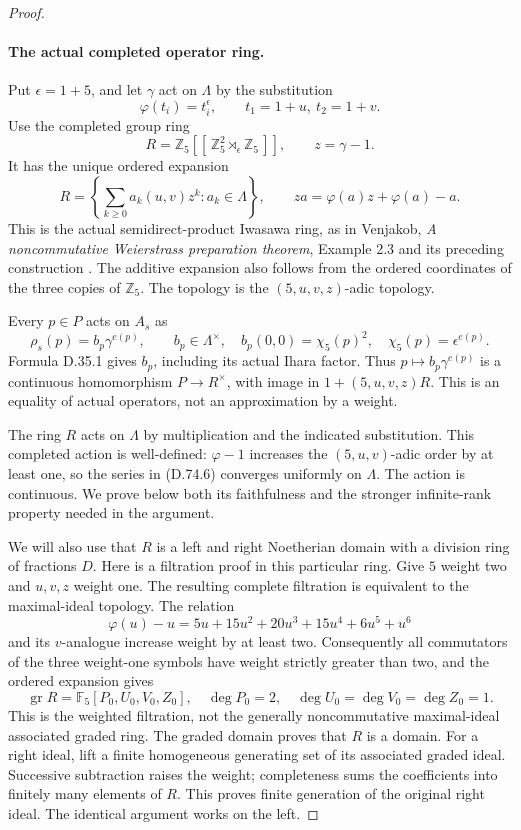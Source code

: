\begin{proof}
\paragraph{The actual completed operator ring.}
Put \(\epsilon=1+5\), and let
\(\gamma\) act on \(\Lambda\) by the substitution
\[
 \varphi(t_i)=t_i^\epsilon,\qquad t_1=1+u,\ t_2=1+v.
\]
Use the completed group ring
\[
 R=\mathbb Z_5[[\,\mathbb Z_5^2\rtimes_\epsilon\mathbb Z_5\,]],
 \qquad z=\gamma-1.
                                                        \tag{D.74.5}
\]
It has the unique ordered expansion
\[
 R=\left\{\sum_{k\ge0}a_k(u,v)z^k:a_k\in\Lambda\right\},
 \qquad
 z a=\varphi(a)z+\varphi(a)-a.
                                                        \tag{D.74.6}
\]
This is the actual semidirect-product Iwasawa ring, as in
Venjakob, \emph{A noncommutative Weierstrass preparation
theorem}, Example 2.3 and its preceding construction
\cite{DE_Venjakob2002Skew}.
The additive expansion also follows from the ordered
coordinates of the three copies of \(\mathbb Z_5\).
The topology is the \((5,u,v,z)\)-adic topology.

Every \(p\in P\) acts on \(A_s\) as
\[
 \rho_s(p)=b_p\gamma^{e(p)},\qquad
 b_p\in\Lambda^\times,\quad b_p(0,0)=\chi_5(p)^2,\quad
 \chi_5(p)=\epsilon^{e(p)}.
                                                        \tag{D.74.7}
\]
Formula D.35.1 gives \(b_p\), including its actual Ihara
factor. Thus \(p\mapsto b_p\gamma^{e(p)}\) is a continuous
homomorphism \(P\to R^\times\), with image in
\(1+(5,u,v,z)R\). This is an equality of actual operators,
not an approximation by a weight.

The ring \(R\) acts on \(\Lambda\) by multiplication and
the indicated substitution. This completed action is
well-defined: \(\varphi-1\) increases the
\((5,u,v)\)-adic order by at least one, so the series
in (D.74.6) converges uniformly on \(\Lambda\).
The action is continuous. We prove below both its
faithfulness and the stronger infinite-rank property
needed in the argument.

We will also use that \(R\) is a left and right
Noetherian domain with a division ring of fractions \(D\).
Here is a filtration proof in this particular ring.
Give \(5\) weight two and \(u,v,z\) weight one.
The resulting complete filtration is equivalent to the
maximal-ideal topology. The relation
\[
 \varphi(u)-u=5u+15u^2+20u^3+15u^4+6u^5+u^6
\]
and its \(v\)-analogue increase weight by at least two.
Consequently all commutators of the three weight-one
symbols have weight strictly greater than two, and the
ordered expansion gives
\[
             \operatorname{gr}R
                   =\mathbb F_5[P_0,U_0,V_0,Z_0],
 \quad \deg P_0=2,\quad
 \deg U_0=\deg V_0=\deg Z_0=1.                         \tag{D.74.8}
\]
This is the weighted filtration, not the generally
noncommutative maximal-ideal associated graded ring.
The graded domain proves that \(R\) is a domain.
For a right ideal, lift a finite homogeneous generating
set of its associated graded ideal. Successive
subtraction raises the weight; completeness sums the
coefficients into finitely many elements of \(R\).
This proves finite generation of the original right
ideal. The identical argument works on the left.


\end{proof}
